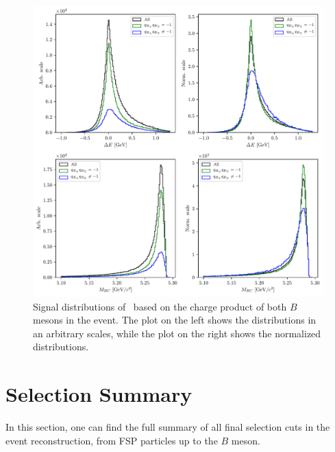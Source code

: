 \begin{figure}[H]
	\centering
	\captionsetup{width=0.8\linewidth}
	\includegraphics[width=\linewidth]{fig/sig_categ}
	\caption{Signal distributions of \vars~based on the charge product of both $B$ mesons in the event. The plot on the left shows the distributions in an arbitrary scales, while the plot on the right shows the normalized distributions.}
	\label{fig:sig_categ}
\end{figure}

\section{Selection Summary}
\label{s:ss}
In this section, one can find the full summary of all final selection cuts in the event reconstruction, from FSP particles up to the $B$ meson.

